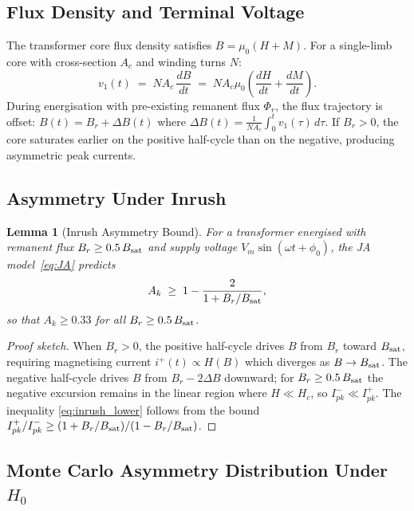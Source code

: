 \documentclass[11pt, a4paper]{article}
\newtheorem{lemma}{Lemma}
\newcommand{\Ak}{A_k}
\begin{document}
\subsection{Flux Density and Terminal Voltage}

The transformer core flux density satisfies $B = \mu_0(H + M)$.  For a
single-limb core with cross-section $A_c$ and winding turns $N$:
\begin{equation}
  v_1(t) \;=\; N A_c \,\frac{dB}{dt} \;=\; N A_c \mu_0 \left(\frac{dH}{dt} + \frac{dM}{dt}\right).
  \label{eq:faraday}
\end{equation}
During energisation with pre-existing remanent flux $\Phi_r$, the flux
trajectory is offset: $B(t) = B_r + \Delta B(t)$ where
$\Delta B(t) = \frac{1}{NA_c}\int_0^t v_1(\tau)\,d\tau$.  If $B_r > 0$,
the core saturates earlier on the positive half-cycle than on the negative,
producing asymmetric peak currents.

\subsection{Asymmetry Under Inrush}

\begin{lemma}[Inrush Asymmetry Bound]
\label{lem:inrush}
For a transformer energised with remanent flux $B_r \geq 0.5\,B_{\rm sat}$
and supply voltage $V_m\sin(\omega t + \phi_0)$, the JA model~\eqref{eq:JA}
predicts
\begin{equation}
  \Ak \;\geq\; 1 - \frac{2}{1 + B_r/B_{\rm sat}},
  \label{eq:inrush_lower}
\end{equation}
so that $\Ak \geq 0.33$ for all $B_r \geq 0.5\,B_{\rm sat}$.
\end{lemma}
\begin{proof}[Proof sketch]
When $B_r > 0$, the positive half-cycle drives $B$ from $B_r$ toward
$B_{\rm sat}$, requiring magnetising current $i^+(t) \propto H(B)$ which diverges
as $B \to B_{\rm sat}$.  The negative half-cycle drives $B$ from $B_r - 2\Delta B$
downward; for $B_r \geq 0.5\,B_{\rm sat}$ the negative excursion remains in the
linear region where $H \ll H_c$, so $I^-_{pk} \ll I^+_{pk}$.  The inequality
\eqref{eq:inrush_lower} follows from the bound
$I^+_{pk}/I^-_{pk} \geq (1 + B_r/B_{\rm sat})/(1 - B_r/B_{\rm sat})$.
\end{proof}

\subsection{Monte Carlo Asymmetry Distribution Under $H_0$}
\end{document}
